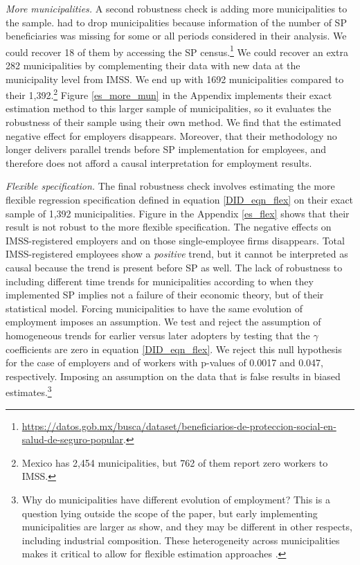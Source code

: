\documentclass[oneside,11pt]{article}
\begin{document}
\textit{More municipalities.} A second robustness check is adding more municipalities to the sample. \cite{Campos} had to drop municipalities because information of the number of SP beneficiaries was missing for some or all periods considered in their analysis. We could recover 18 of them by accessing the SP census.\footnote{\url{https://datos.gob.mx/busca/dataset/beneficiarios-de-proteccion-social-en-salud-de-seguro-popular}.}  We could recover an extra 282 municipalities by complementing their data with new data at the municipality level from IMSS. We end up with 1692 municipalities compared to their 1,392.\footnote{Mexico has 2,454 municipalities, but 762 of them report zero workers to IMSS.} Figure \ref{es_more_mun} in the Appendix implements their exact estimation method to this larger sample of municipalities, so it evaluates the robustness of their sample using their own method. We find that the estimated negative effect for employers disappears. Moreover, that their methodology no longer delivers parallel trends before SP implementation for employees, and therefore does not afford a causal interpretation for employment results.

\textit{Flexible specification.} The final robustness check involves estimating the more flexible regression specification defined in equation \ref{DID_eqn_flex} on their exact sample of 1,392 municipalities. Figure in the Appendix \ref{es_flex} shows that their result is not robust to the more flexible specification.  The negative effects on IMSS-registered employers and on those single-employee firms disappears. Total IMSS-registered employees show a \textit{positive} trend, but it cannot be interpreted as causal because the trend is present before SP as well. The lack of robustness to including different time trends for municipalities according to when they implemented SP implies not a failure of their economic theory, but of their statistical model. Forcing municipalities to have the same evolution of employment imposes an assumption. We test and reject the assumption of homogeneous trends for earlier versus later adopters by testing that the $\gamma$ coefficients are zero in equation \ref{DID_eqn_flex}. We reject this null hypothesis for the case of employers and of workers with p-values of 0.0017 and 0.047, respectively. Imposing an assumption on the data that is false results in biased estimates.\footnote{Why do municipalities have different evolution of employment? This is a question lying outside the scope of the paper, but early implementing municipalities are larger as \cite{Campos} show, and they may be different in other respects, including industrial composition. These heterogeneity across municipalities makes it critical to allow for flexible estimation approaches \citep{Wooldridge}.}
\end{document}
